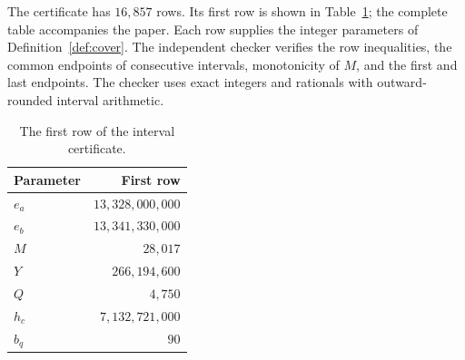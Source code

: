 \documentclass[11pt]{article}
\theoremstyle{definition}
\theoremstyle{remark}
\begin{document}
\begin{appendices}
The certificate has $16{,}857$ rows. Its first row is shown in
Table~\ref{tab:cover}; the complete table accompanies the paper.
Each row supplies the integer parameters of Definition~\ref{def:cover}.
The independent checker verifies the row inequalities, the common
endpoints of consecutive intervals, monotonicity of $M$, and the first
and last endpoints. The checker uses exact integers and rationals with
outward-rounded interval arithmetic. 

\begin{table}[ht]
\centering
\begin{tabular}{lr}
Parameter & First row\\\hline
$e_a$ & $13{,}328{,}000{,}000$\\
$e_b$ & $13{,}341{,}330{,}000$\\
$M$ & $28{,}017$\\
$Y$ & $266{,}194{,}600$\\
$Q$ & $4{,}750$\\
$h_c$ & $7{,}132{,}721{,}000$\\
$b_q$ & $90$
\end{tabular}
\caption{The first row of the interval certificate.}\label{tab:cover}
\end{table}

\end{appendices}
\end{document}
